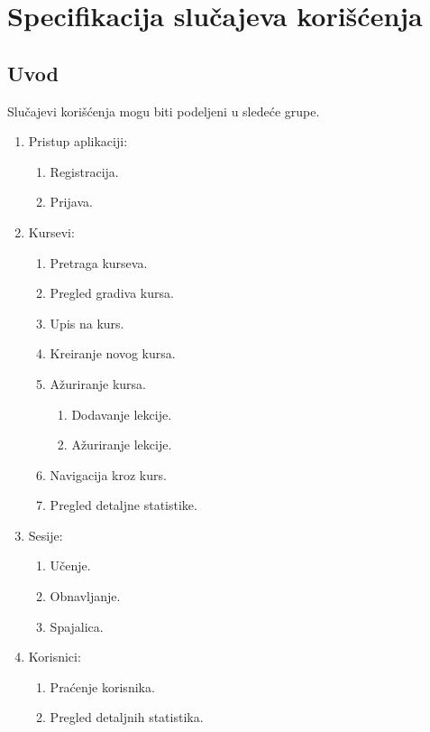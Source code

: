 \part{Specifikacija slučajeva korišćenja}
\label{part:use-case}

\chapter{Uvod}
\label{ch:use-case-uvod}
Slučajevi korišćenja mogu biti podeljeni u sledeće grupe.
\begin{enumerate}
  \item Pristup aplikaciji:
  \begin{enumerate}
    \item Registracija.
    \item Prijava.
  \end{enumerate}
  \item Kursevi:
  \begin{enumerate}
    \item Pretraga kurseva.
	\item Pregled gradiva kursa.
    \item Upis na kurs.
    \item Kreiranje novog kursa.
    \item Ažuriranje kursa.
    \begin{enumerate}
      \item Dodavanje lekcije.
      \item Ažuriranje lekcije.
    \end{enumerate}
    \item Navigacija kroz kurs.
    \item Pregled detaljne statistike.
  \end{enumerate}
  \item Sesije:
  \begin{enumerate}
    \item Učenje.
    \item Obnavljanje.
    \item Spajalica.
  \end{enumerate}
  \item Korisnici:
  \begin{enumerate}
    \item Praćenje korisnika.
    \item Pregled detaljnih statistika.
  \end{enumerate}
\end{enumerate}




